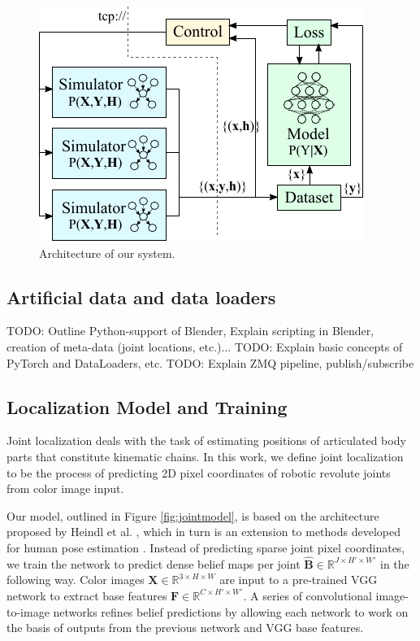 \documentclass[conference]{IEEEtran}
\begin{document}
    \begin{figure}[htbp]
        \centerline{\includegraphics[width=0.9\columnwidth]{figures/architecture/overview.pdf}}
        \caption{\label{fig:architecture} Architecture of our system.}
    \end{figure}


\subsection{Artificial data and data loaders}

TODO: Outline Python-support of Blender, Explain scripting in Blender, creation of meta-data (joint locations, etc.)...
TODO: Explain basic concepts of PyTorch and DataLoaders, etc.
TODO: Explain ZMQ pipeline, publish/subscribe

\subsection{Localization Model and Training}

    Joint localization deals with the task of estimating positions of articulated body parts that constitute kinematic chains. In this work, we define joint localization to be the process of predicting 2D pixel coordinates of robotic revolute joints from color image input. 
    
    Our model, outlined in Figure \ref{fig:jointmodel}, is based on the architecture proposed by Heindl et al. \cite{cheind2019disp}, which in turn is an extension to methods developed for human pose estimation \cite{cao2017realtime, newell2016stacked}. Instead of predicting sparse joint pixel coordinates, we train the network to predict dense belief maps per joint $\hat{\mathbf{B}} \in \mathbb{R}^{J \times H' \times W'}$ in the following way. Color images $\mathbf{X} \in \mathbb{R}^{3 \times H\times W}$ are input to a pre-trained VGG network \cite{simonyan2014very} to extract base features $\mathbf{F} \in \mathbb{R}^{C \times H' \times W'}$. A series of convolutional image-to-image networks refines belief predictions by allowing each network to work on the basis of outputs from the previous network and VGG base features.
\end{document}
